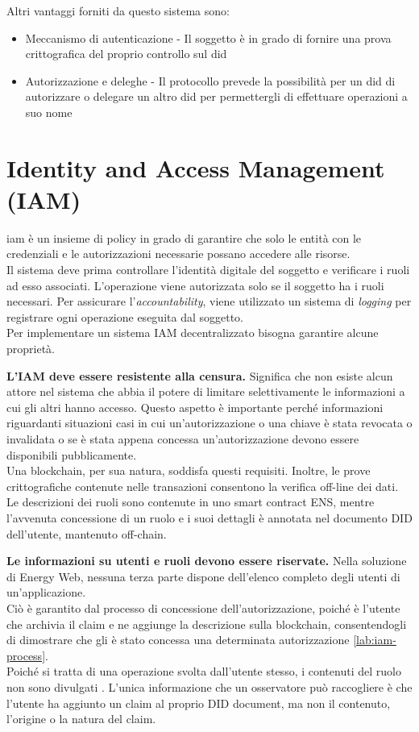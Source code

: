 Altri vantaggi forniti da questo sistema sono:
\begin{itemize}
    \item Meccanismo di autenticazione - Il soggetto è in grado di fornire una prova crittografica del proprio controllo sul \gls{did}
    \item Autorizzazione e deleghe -  Il protocollo prevede la possibilità per un \gls{did} di autorizzare o delegare un altro \gls{did} per permettergli di effettuare operazioni a suo nome
\end{itemize}

\section{Identity and Access Management (IAM)}
\label{sec:iam}

\gls{iam} è un insieme di policy in grado di garantire che solo le entità con le credenziali e le autorizzazioni necessarie possano accedere alle risorse. \\
Il sistema deve prima controllare l'identità digitale del soggetto e verificare i ruoli ad esso associati.
L'operazione viene autorizzata solo se il soggetto ha i ruoli necessari.
Per assicurare l'\textit{accountability}, viene utilizzato un sistema di \textit{logging} per registrare ogni operazione eseguita dal soggetto.\\

Per implementare un sistema IAM decentralizzato bisogna garantire alcune proprietà. 

\textbf{L'IAM deve essere resistente alla censura.}
Significa che non esiste alcun attore nel sistema che abbia il potere di limitare selettivamente le informazioni a cui gli altri hanno accesso.
Questo aspetto è importante perché informazioni riguardanti situazioni casi in cui un'autorizzazione o una chiave è stata revocata o invalidata o se è stata appena concessa un'autorizzazione devono essere disponibili pubblicamente. \\
Una blockchain, per sua natura, soddisfa questi requisiti. Inoltre, le prove crittografiche contenute nelle transazioni consentono la verifica off-line dei dati.
Le descrizioni dei ruoli sono contenute in uno smart contract ENS, mentre l'avvenuta concessione di un ruolo e i suoi dettagli è annotata nel documento DID dell'utente, mantenuto off-chain.

\textbf{Le informazioni su utenti e ruoli devono essere riservate.}
Nella soluzione di Energy Web, nessuna terza parte dispone dell'elenco completo degli utenti di un'applicazione. \\
Ciò è garantito dal processo di concessione dell'autorizzazione, poiché è l'utente che archivia il claim e ne aggiunge la descrizione sulla blockchain, consentendogli di dimostrare che gli è stato concessa una determinata autorizzazione \autoref{lab:iam-process}. \\
Poiché si tratta di una operazione svolta dall'utente stesso, i contenuti del ruolo non sono divulgati \cite{img:iam}.
L'unica informazione che un osservatore può raccogliere è che l'utente ha aggiunto un claim al proprio DID document, ma non il contenuto, l'origine o la natura del claim. \\

